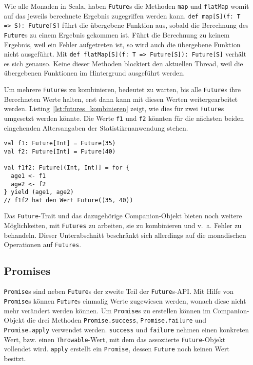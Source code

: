 Wie alle Monaden in Scala, haben \lstinline|Future|s die Methoden \lstinline|map| und \lstinline|flatMap| womit auf das jeweils berechnete Ergebnis zugegriffen werden kann.
\lstinline|def map[S](f: T => S): Future[S]| führt die übergebene Funktion aus, sobald die Berechnung des \lstinline|Future|s zu einem Ergebnis gekommen ist.
Führt die Berechnung zu keinem Ergebnis, weil ein Fehler aufgetreten ist, so wird auch die übergebene Funktion nicht ausgeführt.
Mit \lstinline|def flatMap[S](f: T => Future[S]): Future[S]| verhält es sich genauso.
Keine dieser Methoden blockiert den aktuellen Thread, weil die übergebenen Funktionen im Hintergrund ausgeführt werden.

Um mehrere \lstinline|Future|s zu kombinieren, bedeutet zu warten, bis alle \lstinline|Future|s ihre Berechneten Werte halten, erst dann kann mit diesen Werten weitergearbeitet werden.
Listing~\ref{lst:futures_kombinieren} zeigt, wie dies für zwei \lstinline|Future|s umgesetzt werden könnte.
Die Werte \lstinline|f1| und \lstinline|f2| könnten für die nächsten beiden eingehenden Altersangaben der Statistikenanwendung stehen.

\begin{lstlisting}[caption=Futures kombinieren, label=lst:futures_kombinieren]
val f1: Future[Int] = Future(35)
val f2: Future[Int] = Future(40)

val f1f2: Future[(Int, Int)] = for {
  age1 <- f1
  age2 <- f2
} yield (age1, age2)
// f1f2 hat den Wert Future((35, 40))
\end{lstlisting}

Das \lstinline|Future|-Trait und das dazugehörige Companion-Objekt bieten noch weitere Möglichkeiten, mit \lstinline|Futures| zu arbeiten, sie zu kombinieren und v.~a. Fehler zu behandeln.
Dieser Unterabschnitt beschränkt sich allerdings auf die monadischen Operationen auf \lstinline|Futures|.



\subsection{Promises} %
\label{sub:promises}

\lstinline|Promise|s sind neben \lstinline|Future|s der zweite Teil der \lstinline|Future|s-API.
Mit Hilfe von \lstinline|Promise|s können \lstinline|Future|s einmalig Werte zugewiesen werden, wonach diese nicht mehr verändert werden können.
Um \lstinline|Promise|s zu erstellen können im Companion-Objekt die drei Methoden \lstinline|Promise.success|, \lstinline|Promise.failure| und \lstinline|Promise.apply| verwendet werden.
\lstinline|success| und \lstinline|failure| nehmen einen konkreten Wert, bzw. einen \lstinline|Throwable|-Wert, mit dem das assoziierte \lstinline|Future|-Objekt vollendet wird.
\lstinline|apply| erstellt ein \lstinline|Promise|, dessen \lstinline|Future| noch keinen Wert besitzt.

